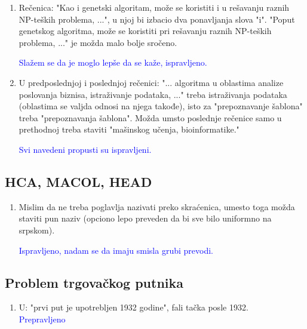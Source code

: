 \documentclass[a4paper]{report}
\newcommand{\odgovor}[1]{\textcolor{blue}{#1}}
\begin{document}
\begin{enumerate}
  \item Rečenica: "Kao i genetski algoritam, može se koristiti i u rešavanju raznih
NP-teških problema, ...", u njoj bi izbacio dva ponavljanja slova "i". "Poput genetskog algoritma, može se koristiti pri rešavanju raznih NP-teških problema, ..." je možda malo bolje sročeno.

  \odgovor{Slažem se da je moglo lepše da se kaže, ispravljeno.}
  
  \item U predposlednjoj i poslednjoj rečenici: "... algoritma u oblastima analize poslovanja biznisa, istraživanje podataka, ..." treba istraživanja podataka (oblastima se valjda odnosi na njega takođe), isto za "prepoznavanje šablona" treba "prepoznavanja šablona". Možda umsto poslednje rečenice samo u prethodnoj treba staviti "mašinskog učenja, bioinformatike."
  
  \odgovor{Svi navedeni propusti su ispravljeni.}
  
\end{enumerate}

\subsection{HCA, MACOL, HEAD}
\begin{enumerate}
  \item Mislim da ne treba poglavlja nazivati preko skraćenica, umesto toga možda staviti pun naziv (opciono lepo preveden da bi sve bilo uniformno na srpskom).
  
  \odgovor{Ispravljeno, nadam se da imaju smisla grubi prevodi.}
\end{enumerate}

\subsection{Problem trgovačkog putnika}
\begin{enumerate}
  \item U: "prvi put je upotrebljen 1932 godine", fali tačka posle 1932.\\
\odgovor{Prepravljeno \\}
\end{enumerate}
\end{document}
